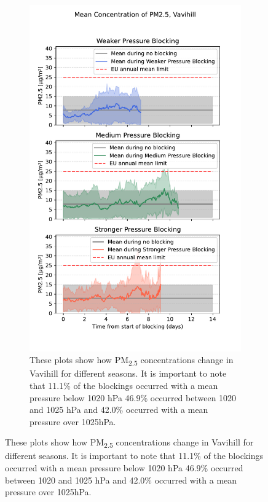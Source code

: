 \begin{figure}[H]
    \centering
    \begin{subfigure}[b]{0.49\textwidth}
        \centering
        \includegraphics[width=\textwidth]{Figures/Meanplot_pressure_Vavihill.pdf}
        \caption{These plots show how PM\textsubscript{2.5} concentrations change in Vavihill for different seasons. It is important to note that 11.1\% of the blockings occurred with a mean pressure below 1020 hPa 46.9\% occurred between 1020 and 1025 hPa and 42.0\% occurred with a mean pressure over 1025hPa.}
        \label{fig:Meanplot_pressure_Vavihill}
    \end{subfigure}

\end{figure}
